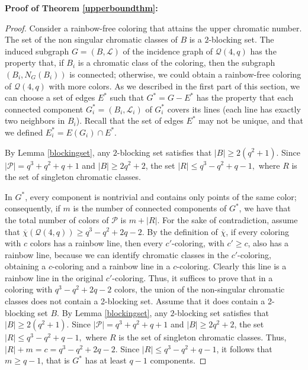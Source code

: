 \documentclass[12pt]{article}
\begin{document}
{\bf{ Proof of Theorem \ref{upperboundthm}: }}

\begin{proof}

{Consider a} rainbow-free coloring that attains the upper chromatic {number}. {The set  of the non singular chromatic classes of $B$} is  a  $2$-blocking set. {The} induced subgraph $G = (B, \mathcal{L})$  of the incidence graph of ${\mathcal{Q}(4,q)}$ {has}  the property that, if $B_i$ is a chromatic class of the coloring, then the subgraph $(B_i, N_G(B_i))$ is connected; otherwise, we could obtain a rainbow-free coloring of $\mathcal{Q}(4,q)$ with more colors. 
{As we described in the first part of this section, we can choose a set of edges $E^*$ such that $G^*=G-E^*$
has the property that each connected component $G^*_i=(B_i, \mathcal{L}_i)$ of $G_i^*$ covers its lines (each line has exactly two neighbors in $B_i$)}. Recall that the set of edges $E^*$ may not be unique, and that we defined $E^*_i=E(G_i)\cap E^*.$

By Lemma \ref {blockingset}, any $2$-blocking set satisfies that $|B| \ge 2(q^2 + 1)$. Since $|\mathcal{P}| = q^3 + q^2 + q + 1$ and $|B| \ge 2q^2 + 2$, the set $|R| \leq q^3 - q^2 + q - 1,$ where $R$ is the set of singleton chromatic  classes.

In $G^*$, every component is nontrivial and contains only points of the same color; consequently, if $m$ is the number of connected components of $G^*$, we have that the total number of colors of $\mathcal{P}$ is $m + |R|$.
{For the sake of contradiction, assume that $\overline{\chi}(\mathcal{Q}(4,q))\geq q^3 -q^2 +2q-2 $. By the definition of $\overline{\chi}$, 
if every coloring with $c$ colors has a rainbow line, then every $c'$-coloring, with $c'\geq c$, also has a rainbow line, because we can identify chromatic classes in the $c'$-coloring, obtaining a $c$-coloring and a rainbow line in a $c$-coloring. Clearly this line is a rainbow line in the original $c'$-coloring}. Thus, it suffices to prove that in a coloring with $q^3 -q^2 +2q-2 $ colors, the union of the non-singular chromatic classes does not contain a 2-blocking set. Assume that it does contain a 2-blocking set $B$. By Lemma \ref {blockingset}, any $2$-blocking set satisfies that $|B| \ge 2(q^2 + 1)$. Since $|\mathcal{P}| = q^3 + q^2 + q + 1$ and $|B| \ge 2q^2 + 2$, the set $|R| \leq q^3 - q^2 + q - 1,$ where $R$ is the set of singleton chromatic classes.
Thus,  {$|R| + m =c = q^3 - q^2 +2q -2 $.} Since $|R| \le q^3 - q^2 + q - 1$, it follows that $m \ge q - 1$, that is $G^*$ has at least $q-1$ components. 


\end{proof}
\end{document}
